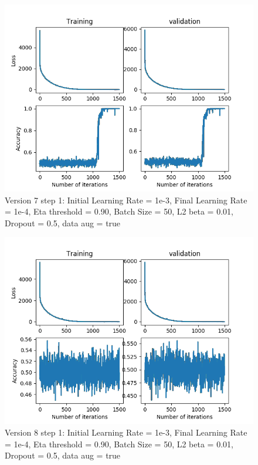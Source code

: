 \documentclass[12pt,reqno]{amsart}
\numberwithin{equation}{section}
\begin{document}
\begin{enumerate}
\begin{figure}[H]
\centering
\includegraphics[scale=0.6]{data_liquid5_version7_step1}
\caption{Version 7 step 1: Initial Learning Rate = 1e-3, Final Learning Rate = 1e-4, Eta threshold = 0.90, Batch Size = 50, L2 beta = 0.01, Dropout = 0.5, data aug = true}
\end{figure}

\begin{figure}[H]
\centering
\includegraphics[scale=0.6]{data_liquid5_version8_step1}
\caption{Version 8 step 1: Initial Learning Rate = 1e-3, Final Learning Rate = 1e-4, Eta threshold = 0.90, Batch Size = 50, L2 beta = 0.01, Dropout = 0.5, data aug = true}
\end{figure}


\end{enumerate}
\end{document}
